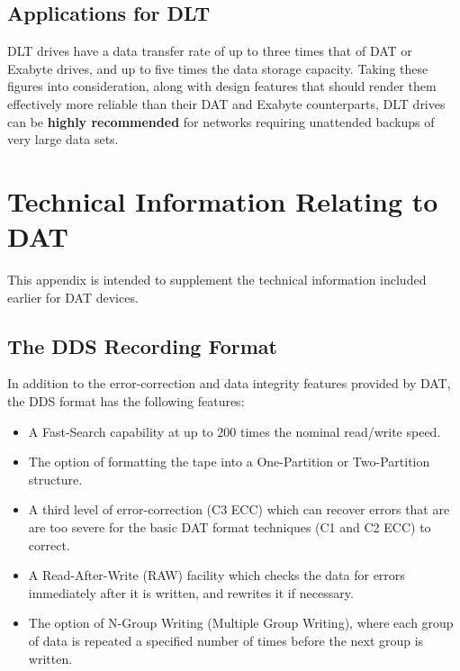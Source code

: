 \documentclass[11pt]{article}
\begin{document}
\subsection {Applications for DLT}

DLT drives have a data transfer rate of up to three times that of DAT or
Exabyte drives, and up to five times the data storage capacity. Taking these
figures into consideration, along with design features that should render
them effectively more reliable than their DAT and Exabyte counterparts, DLT
drives can be {\bf highly recommended} for networks requiring unattended
backups of very large data sets.

\clearpage

\appendix

\section {Technical Information Relating to DAT}

This appendix is intended to supplement the technical information included
earlier for DAT devices.

\subsection {The DDS Recording Format}

In addition to the error-correction and data integrity features provided by
DAT, the DDS format has the following features:

\begin {itemize}

\item A Fast-Search capability at up to 200 times the nominal read/write
speed.

\item The option of formatting the tape into a One-Partition or Two-Partition
structure.

\item A third level of error-correction (C3 ECC) which can recover errors
that are are too severe for the basic DAT format techniques (C1 and C2 ECC)
to correct.

\item A Read-After-Write (RAW) facility which checks the data for errors
immediately after it is written, and rewrites it if necessary.

\item The option of N-Group Writing (Multiple Group Writing), where each
group of data is repeated a specified number of times before the next group
is written.

\end {itemize}
\end{document}
